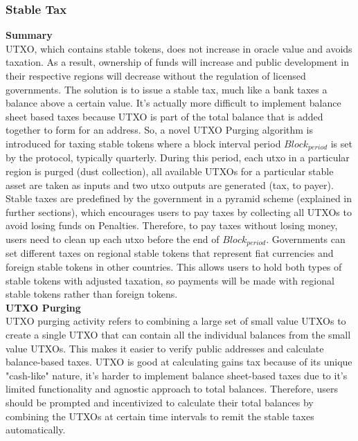 \documentclass[letterpaper,11pt]{article}
\begin{document}
\subsubsection{Stable Tax}

\textbf{Summary}\\

UTXO, which contains stable tokens, does not increase in oracle value and avoids taxation. As a result, ownership of funds will increase and public development in their respective regions will decrease without the regulation of licensed governments. The solution is to issue a stable tax, much like a bank taxes a balance above a certain value. It's actually more difficult to implement balance sheet based taxes because UTXO is part of the total balance that is added together to form for an address. So, a novel UTXO Purging algorithm is introduced for taxing stable tokens where a block interval period $ Block_ {period} $ is set by the protocol, typically quarterly. During this period, each utxo in a particular region is purged (dust collection), all  available UTXOs for a particular stable asset are taken as inputs and two utxo outputs are generated (tax, to payer). Stable taxes are predefined by the government in a pyramid scheme (explained in further sections), which encourages users to pay taxes by collecting all UTXOs to avoid losing funds on Penalties. Therefore, to pay taxes without losing money, users need to clean up each utxo before the end of $ Block_ {period} $. Governments can set different taxes on regional stable tokens that represent fiat currencies and foreign stable tokens in other countries. This allows users to hold both types of stable tokens with  adjusted taxation, so payments will be made with regional stable tokens rather than foreign tokens. \\

\textbf{UTXO Purging}\\

UTXO purging activity refers to combining a large set of small value UTXOs to create a single UTXO that can contain all the individual balances from the small value UTXOs. This makes it easier to verify public addresses and calculate balance-based taxes. UTXO is good at calculating gains tax because of its unique "cash-like" nature, it's harder to implement balance sheet-based taxes due to it's limited functionality and agnostic approach to total balances. Therefore, users should be prompted and incentivized to calculate their total balances by combining the UTXOs at certain time intervals to remit the stable taxes automatically.\\
\end{document}

